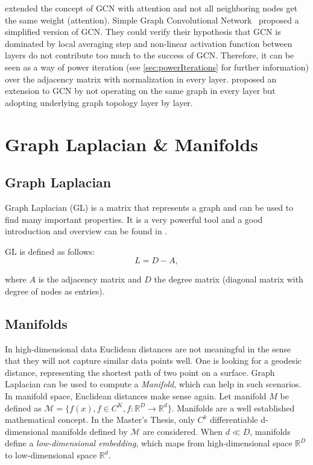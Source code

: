 \citet{GAT} extended the concept of GCN with attention and not all neighboring nodes get the same weight (attention).
Simple Graph Convolutional Network~\cite{simpleGCN} proposed a simplified version of GCN.
They could verify their hypothesis that GCN is dominated by local averaging step and non-linear 
activation function between layers do not contribute too much to the success of GCN. 
Therefore, it can be seen as a way of power iteration (see \ref{sec:powerIterations} \textit{} for further information) over the adjacency matrix with normalization in every layer.
\citet{dynamicGCN} proposed an extension to GCN by not operating on the same graph in every layer but adopting
underlying graph topology layer by layer.

\section{Graph Laplacian \& Manifolds}
\subsection{Graph Laplacian}
Graph Laplacian (GL) is a matrix that represents a graph and can be used to find many important properties.
It is a very powerful tool and a good introduction and overview can be found in \cite{tutorialSpectralClustering, SpectralGraphTheory}. 

GL is defined as follows:
\begin{equation}
    \label{eq:gl}
    L = D - A,
\end{equation}

where $A$ is the adjacency matrix and $D$ the degree matrix (diagonal matrix with degree of nodes as entries).

\subsection{Manifolds}
\label{sec:manifolds}

In high-dimensional data Euclidean distances are not meaningful
in the sense that they will not capture similar data points well. One is looking for a geodesic distance, 
representing the shortest path of two point on a surface.
Graph Laplacian can be used to compute a \textit{Manifold}, which can help in such scenarios. 
In manifold space, Euclidean distances make sense again. 
Let manifold $M$ be defined as $\mathcal{M} = \{ f(x), f \in C^K, f: \mathbb{R}^D \to \mathbb{R}^d \}$.
Manifolds are a well established mathematical concept. In the Master's Thesis, only 
$C^k$ differentiable d-dimensional manifolds defined by $\mathcal{M}$ are considered. 
When $d \ll D$, manifolds define a \textit{low-dimensional embedding}, which maps from high-dimensional space 
$\mathbb{R}^D$ to low-dimensional space $\mathbb{R}^d$.

